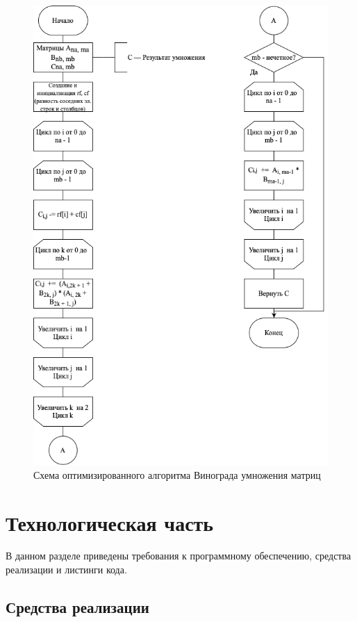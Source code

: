\begin{figure}
    \centering
    \includegraphics[scale=0.75]{vinograd_opt.png}
    \caption{Схема оптимизированного алгоритма Винограда умножения матриц}
    \label{img:vinograd_opt}
\end{figure}

\section{Технологическая часть}

В данном разделе приведены требования к программному обеспечению, средства реализации и листинги кода.



\subsection{Средства реализации}


